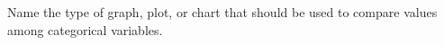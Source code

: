 \question[2]
Name the type of graph, plot, or chart that should be used to compare values among categorical variables. 

